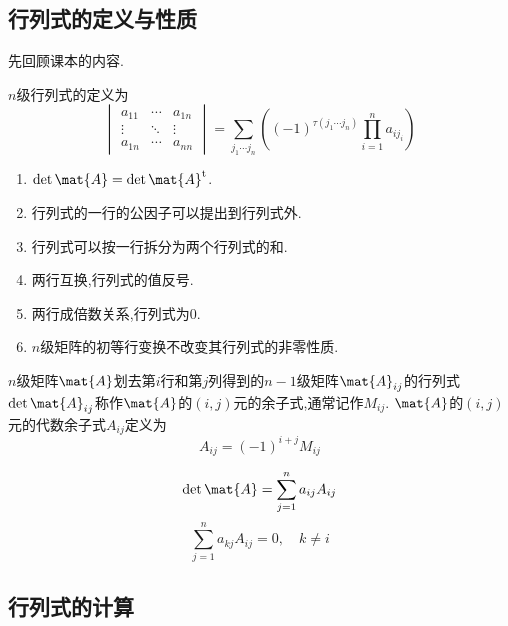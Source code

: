 \documentclass{ctexart}
\begin{document}
\subsection{行列式的定义与性质}
先回顾课本的内容.
\begin{definition}[行列式的定义]
    $n$级行列式的定义为
    \[\begin{vmatrix}
        a_{11}&\cdots&a_{1n}\\
        \vdots&\ddots&\vdots\\
        a_{1n}&\cdots&a_{nn}
    \end{vmatrix}=\sum_{j_1\cdots j_n}\left((-1)^{\tau\left(j_1\cdots j_n\right)}\prod_{i=1}^{n}a_{ij_i}\right)\]
\end{definition}
\begin{theorem}[行列式的性质]
    \begin{enumerate}
        \item $\det\mat{A}=\det\mat{A}^{\text{t}}$.
        \item 行列式的一行的公因子可以提出到行列式外.
        \item 行列式可以按一行拆分为两个行列式的和.
        \item 两行互换,行列式的值反号.
        \item 两行成倍数关系,行列式为$0$. 
        \item $n$级矩阵的初等行变换不改变其行列式的非零性质.
    \end{enumerate}
\end{theorem}
\begin{definition}[余子式和代数余子式]
    $n$级矩阵$\mat{A}$划去第$i$行和第$j$列得到的$n-1$级矩阵$\mat{A}_{ij}$的行列式$\det\mat{A}_{ij}$称作$\mat{A}$的$(i,j)$元的余子式,通常记作$M_{ij}$. $\mat{A}$的$(i,j)$元的代数余子式$A_{ij}$定义为
    \[A_{ij}=(-1)^{i+j}M_{ij}\]
\end{definition}
\begin{theorem}[行列式按一行展开]
    \[\det\mat{A}=\sum_{j=1}^{n}a_{ij}A_{ij}\]
    \[\sum_{j=1}^{n}a_{kj}A_{ij}=0,\quad k\neq i\]
\end{theorem}
\subsection{行列式的计算}
\end{document}
